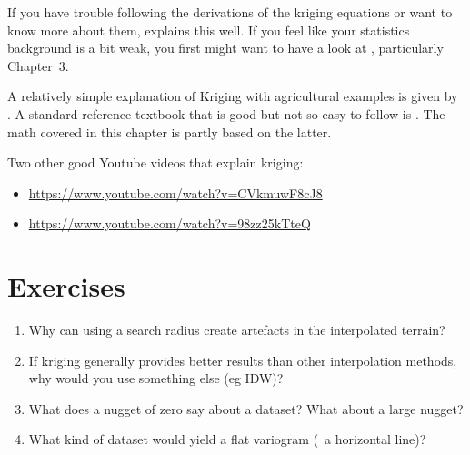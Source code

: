 If you have trouble following the derivations of the kriging equations or want to know more about them, \citet{Lichtenstern13} explains this well.
If you feel like your statistics background is a bit weak, you first might want to have a look at \citet{Fewster14}, particularly Chapter~3.

A relatively simple explanation of Kriging with agricultural examples is given by \citet{Oliver15}.
A standard reference textbook that is good but not so easy to follow is \citet{Wackernagel03}.
The math covered in this chapter is partly based on the latter.

Two other good Youtube videos that explain kriging:
\begin{itemize}
\item \url{https://www.youtube.com/watch?v=CVkmuwF8cJ8}
\item \url{https://www.youtube.com/watch?v=98zz25kTteQ}
\end{itemize}

%
\section{Exercises}

\begin{enumerate}
\item Why can using a search radius create artefacts in the interpolated terrain?
\item If kriging generally provides better results than other interpolation methods, why would you use something else (eg IDW)?
\item What does a nugget of zero say about a dataset? What about a large nugget?
\item What kind of dataset would yield a flat variogram (\ie\ a horizontal line)?
\end{enumerate}